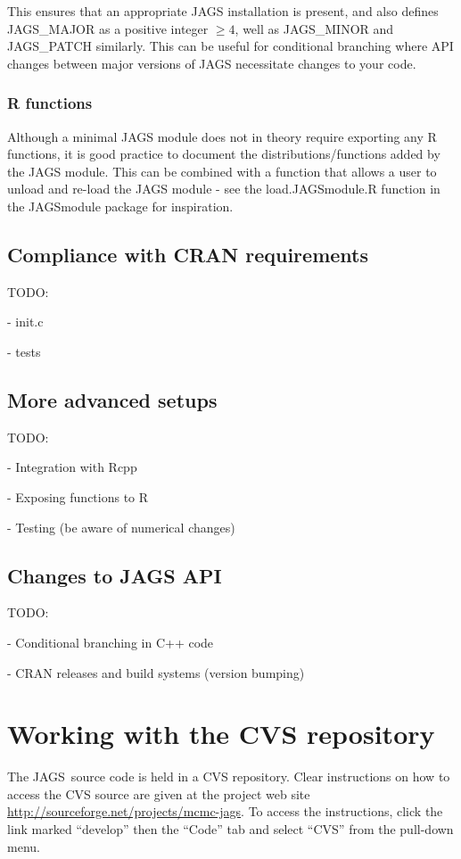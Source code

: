 \documentclass[11pt, a4paper, titlepage]{report}
\newcommand{\JAGS}{\textsf{JAGS}}
\begin{document}
This ensures that an appropriate JAGS installation is present, and also
defines JAGS\_MAJOR as a positive integer $\ge 4$, well as JAGS\_MINOR
and JAGS\_PATCH similarly. This can be useful for conditional branching
where API changes between major versions of JAGS necessitate changes
to your code.

\subsection{R functions}

Although a minimal JAGS module does not in theory require exporting any
R functions, it is good practice to document the distributions/functions
added by the JAGS module. This can be combined with a function that
allows a user to unload and re-load the JAGS module - see the 
load.JAGSmodule.R function in the JAGSmodule package for inspiration.

\section{Compliance with CRAN requirements}

TODO:

- init.c

- tests

\section{More advanced setups}

TODO:

- Integration with Rcpp

- Exposing functions to R

- Testing (be aware of numerical changes)


\section{Changes to JAGS API}

TODO:

- Conditional branching in C++ code

- CRAN releases and build systems (version bumping)



\chapter{Working with the CVS repository}

The \JAGS\ source code is held in a CVS repository.  Clear
instructions on how to access the CVS source are given at the project
web site \url{http://sourceforge.net/projects/mcmc-jags}. To access
the instructions, click the link marked ``develop'' then the ``Code''
tab and select ``CVS'' from the pull-down menu.
\end{document}
